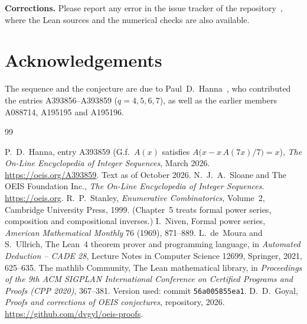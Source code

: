 \documentclass[11pt,a4paper]{article}
\theoremstyle{definition}
\theoremstyle{remark}
\newcommand{\para}[1]{\par\medskip\noindent\textbf{#1}\enspace}
\begin{document}
\para{Corrections.} Please report any error in the issue tracker of the repository~\cite{repo}, where the Lean sources and the numerical checks are also
available.

\section*{Acknowledgements}
The sequence and the conjecture are due to Paul~D.~Hanna~\cite{oeis}, who contributed
the entries A393856--A393859 ($q=4,5,6,7$), as well as the earlier members A088714, A195195 and A195196.

\begin{thebibliography}{99}\small
\raggedright
{} P.~D.~Hanna, entry A393859 (G.f.\ $A(x)$ satisfies $A\bigl(x-x\,A(7x)/7\bigr)=x$), \emph{The On-Line Encyclopedia of Integer Sequences}, March 2026. \url{https://oeis.org/A393859}. Text as of October 2026.
 N.~J.~A.~Sloane and The OEIS Foundation Inc., \emph{The On-Line Encyclopedia of Integer Sequences}. \url{https://oeis.org}.
 R.~P.~Stanley, \emph{Enumerative Combinatorics}, Volume~2, Cambridge University Press, 1999. (Chapter~5 treats formal power series, composition and compositional inverses.)
 I.~Niven, Formal power series, \emph{American Mathematical Monthly} 76 (1969), 871--889.
 L.~de~Moura and S.~Ullrich, The Lean~4 theorem prover and programming language, in \emph{Automated Deduction -- CADE 28}, Lecture Notes in Computer Science 12699, Springer, 2021, 625--635.
 The mathlib Community, The Lean mathematical library, in \emph{Proceedings of the 9th ACM SIGPLAN International Conference on Certified Programs and Proofs (CPP 2020)}, 367--381. Version used: commit \texttt{56a005855ea1}.
 D.~D.~Goyal, \emph{Proofs and corrections of OEIS conjectures}, repository, 2026. \url{https://github.com/dvgyl/oeis-proofs}.
\end{thebibliography}
\end{document}
